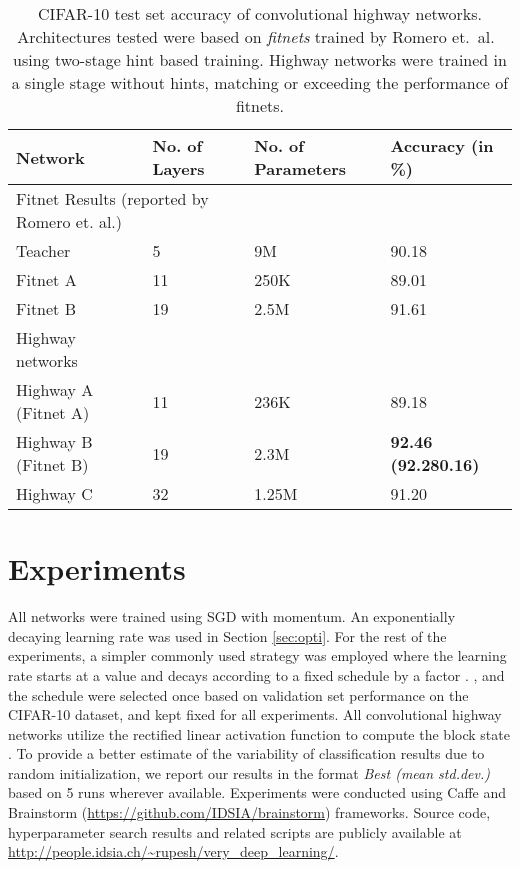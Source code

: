 \documentclass{article}
\begin{document}
\begin{table*}
	\centering
    \begin{tabular}{llll}
    \hline
    \textbf{Network}                                 & \textbf{No. of Layers} & \textbf{No. of Parameters}   & \textbf{Accuracy (in \%)} \\ \hline
    \multicolumn{2}{l}{Fitnet Results (reported by Romero et. al.\cite{Romero2014})} & ~                      & ~        \\
    \quad Teacher                                 & 5                & 9M    & 90.18  \\
    \quad Fitnet A                                & 11               & 250K  & 89.01  \\
    \quad Fitnet B                                & 19               & 2.5M  & 91.61  \\
    \hline
    Highway networks                        & ~                & ~                      & ~        \\
    \quad Highway A (Fitnet A)                    & 11               & 236K  & 89.18  \\
    \quad Highway B (Fitnet B)                    & 19               & 2.3M  & \textbf{92.46 (92.280.16)}  \\
    \quad Highway C                               & 32               & 1.25M & 91.20        \\ \hline
    \end{tabular}
    \caption{CIFAR-10 test set accuracy of convolutional highway networks. Architectures tested were based on
\emph{fitnets} trained by Romero et.~al.~\cite{Romero2014} using two-stage hint based training. Highway networks were trained in a single stage without hints, matching or exceeding the performance of fitnets.}
    \label{tab:fitnets}
\end{table*}


\section{Experiments}
All networks were trained using SGD with momentum. An exponentially decaying learning rate was used in Section \ref{sec:opti}. For the rest of the experiments, a simpler commonly used strategy was employed where the learning rate starts at a value  and decays according to a fixed schedule by a factor . ,  and the schedule were selected once based on validation set performance on the CIFAR-10 dataset, and kept fixed for all experiments.
All convolutional highway networks utilize the rectified linear activation function \cite{Glorot2010} to compute the block state . To provide a better estimate of the variability of classification results due to random initialization, we report our results in the format \textit{Best (mean  std.dev.)} based on 5 runs wherever available. Experiments were conducted using Caffe \cite{Jia2014} and Brainstorm ({\small \url{https://github.com/IDSIA/brainstorm}}) frameworks. Source code, hyperparameter search results and related scripts are publicly available at {\small \url{http://people.idsia.ch/~rupesh/very_deep_learning/}}.
\end{document}
